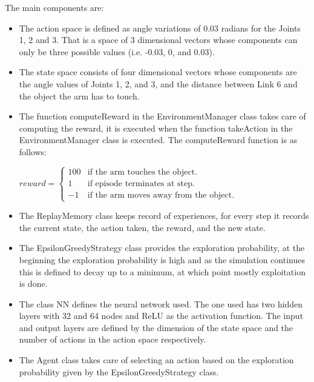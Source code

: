 \documentclass[12pt,oneside]{article}
\begin{document}
The main components are:
\begin{itemize}
\item The action space is defined as angle variations of 0.03 radians for the Joints 1, 2 and 3. That is a space of 3 dimensional vectors whose components can only be three possible values (i.e. -0.03, 0, and 0.03).
\item The state space consists of four dimensional vectors whose components are the angle values of Joints 1, 2, and 3, and the distance between Link 6 and the object the arm has to touch.
\item The function computeReward in the EnvironmentManager class takes care of computing the reward, it is executed when the function takeAction in the EnvironmentManager class is executed. The computeReward function is as follows: 

$reward = 
 \begin{cases} 
 	100 	& \text{if the arm touches the object.} \\ 
 	1 		& \text{if episode terminates at step.} \\ 
 	-1 		& \text{if the arm moves away from the object.} 
 \end{cases}$

\item The ReplayMemory class keeps record of experiences, for every step it records the current state, the action taken, the reward, and the new state.
\item The EpsilonGreedyStrategy class provides the exploration probability, at the beginning the exploration probability is high and as the simulation continues this is defined to decay up to a minimum, at which point mostly exploitation is done.
\item The class NN defines the neural network used. The one used has two hidden layers with 32 and 64 nodes and ReLU as the activation function. The input and output layers are defined by the dimension of the state space and the number of actions in the action space respectively.
\item The Agent class takes care of selecting an action based on the exploration probability given by the EpsilonGreedyStrategy class.

\end{itemize} 
\end{document}
